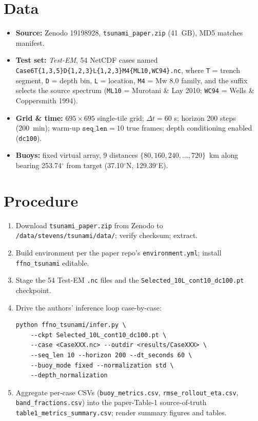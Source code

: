 \documentclass[11pt]{article}
\begin{document}
\section{Data}
\begin{itemize}
\item \textbf{Source:} Zenodo 19198928, \texttt{tsunami\_paper.zip} (41~GB), MD5
  matches manifest.
\item \textbf{Test set:} \textit{Test-EM}, 54 NetCDF cases named
  \texttt{Case6T\{1,3,5\}D\{1,2,3\}L\{1,2,3\}M4\{ML10,WC94\}.nc}, where
  \texttt{T} = trench segment, \texttt{D} = depth bin, \texttt{L} = location,
  \texttt{M4} = Mw 8.0 family, and the suffix selects the source spectrum
  (\texttt{ML10} = Murotani \& Lay 2010; \texttt{WC94} = Wells \&
  Coppersmith 1994).
\item \textbf{Grid \& time:} \(695 \times 695\) single-tile grid; \(\Delta t
  = 60\) s; horizon 200 steps (200~min); warm-up
  \(\texttt{seq\_len}=10\) true frames; depth conditioning enabled
  (\texttt{dc100}).
\item \textbf{Buoys:} fixed virtual array, 9 distances \(\{80, 160, 240,
  \dots, 720\}\)~km along bearing 253.74\(^\circ\) from target
  (37.10\(^\circ\)N, 129.39\(^\circ\)E).
\end{itemize}

\section{Procedure}
\begin{enumerate}
\item Download \texttt{tsunami\_paper.zip} from Zenodo to
  \texttt{/data/stevens/tsunami/data/}; verify checksum; extract.
\item Build environment per the paper repo's \texttt{environment.yml};
  install \texttt{ffno\_tsunami} editable.
\item Stage the 54 Test-EM \texttt{.nc} files and the
  \texttt{Selected\_10L\_cont10\_dc100.pt} checkpoint.
\item Drive the authors' inference loop case-by-case:
\begin{verbatim}
python ffno_tsunami/infer.py \
    --ckpt Selected_10L_cont10_dc100.pt \
    --case <CaseXXX.nc> --outdir <results/CaseXXX> \
    --seq_len 10 --horizon 200 --dt_seconds 60 \
    --buoy_mode fixed --normalization std \
    --depth_normalization
\end{verbatim}
\item Aggregate per-case CSVs (\texttt{buoy\_metrics.csv},
  \texttt{rmse\_rollout\_eta.csv}, \texttt{band\_fractions.csv}) into the
  paper-Table-1 source-of-truth \texttt{table1\_metrics\_summary.csv}; render
  summary figures and tables.
\end{enumerate}
\end{document}
